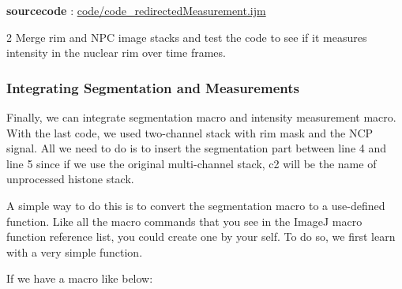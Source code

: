 \textbf{sourcecode} : \href{http://www.example.com/contents}{code/code\_redirectedMeasurement.ijm}

\begin{indentexercise}
{2}
Merge rim and NPC image stacks and test the code to see if it measures intensity in the nuclear rim over time frames. 

\end{indentexercise}

\subsubsection{Integrating Segmentation and Measurements}

Finally, we can integrate segmentation macro and intensity measurement macro. With the last code, we used  two-channel stack with rim mask and the NCP signal. All we need to do is to insert the segmentation part between line 4 and line 5 since if we use the original multi-channel stack, c2 will be the name of unprocessed histone stack.

A simple way to do this is to convert the segmentation macro to a use-defined function. Like all the macro commands that you see in the ImageJ macro function reference list, you could create one by your self. To do so, we first learn with a very simple function.

If we have a macro like below: